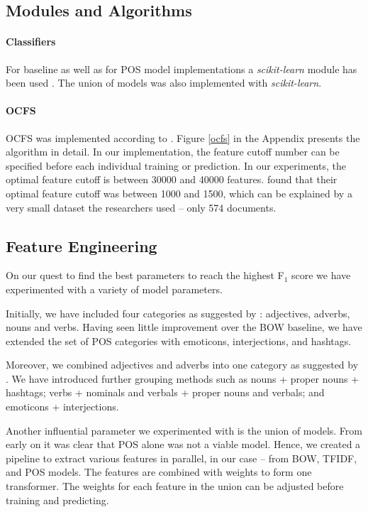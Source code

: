 \documentclass[titlepage]{article}
\begin{document}
     \subsection{Modules and Algorithms}

      \paragraph{Classifiers} 
      For baseline as well as for POS model implementations a  \textit{scikit-learn} module has been used \citep{scikit-learn}. The union of models was also implemented with \textit{scikit-learn}.

      \paragraph{OCFS}
      OCFS was implemented according to \citet{ocfs}. Figure \ref{ocfs} in the Appendix presents the algorithm in detail. In our implementation, the feature cutoff number can be specified before each individual training or prediction. In our experiments, the optimal feature cutoff is between 30000 and 40000 features. \cite{improving-sa} found that their optimal feature cutoff was between 1000 and 1500, which can be explained by a very small dataset the researchers used -- only 574 documents.
      
      \subsection{Feature Engineering} 
      On our quest to find the best parameters to reach the highest F$_{1}$ score we have experimented with a variety of model parameters. 

Initially, we have included four categories as suggested by \cite{improving-sa}: adjectives, adverbs, nouns and verbs. Having seen little improvement over the BOW baseline, we have extended the set of POS categories with emoticons, interjections, and hashtags.
     
Moreover, we combined adjectives and adverbs into one category as suggested by \cite{pos-based-model}. We have introduced further grouping methods such as nouns + proper nouns + hashtags; verbs + nominals and verbals + proper nouns and verbals; and emoticons + interjections.

Another influential parameter we experimented with is the union of models. From early on it was clear that POS alone was not a viable model. Hence, we created a pipeline to extract various features in parallel, in our case -- from BOW, TFIDF, and POS models. The features are combined with weights to form one transformer. The weights for each feature in the union can be adjusted before training and predicting.
\end{document}
